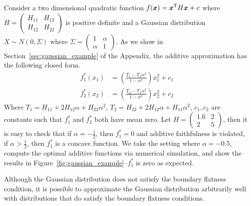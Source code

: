 \begin{example}
\label{examp:gaussian_counterexample}
Consider a two dimensional quadratic function $f( \mbox{\boldmath $x$}) = \mbox{\boldmath $x$}^{\mathsf{T}} H \mbox{\boldmath $x$} + c$ where $H = \begin{pmatrix} H_{11} & H_{12} \\ H_{12} & H_{22}\end{pmatrix}$ is positive definite and a Gaussian distribution $X \sim N(0, \Sigma)$ where $\Sigma = \begin{pmatrix}1 & \alpha \\ \alpha & 1 \end{pmatrix}$.
As we show in Section~\ref{sec:gaussian_example} of the Appendix, the additive approximation has the
following closed form.
\begin{align*}
f^*_1(x_1) &= \left( \frac{T_1 - T_2 \alpha^2}{1 - \alpha^4} \right) x_1^2 + c_1\\
f^*_2(x_2) &= \left( \frac{T_2 - T_1 \alpha^2}{1 - \alpha^4} \right) x_2^2 + c_2
\end{align*}
Where $T_1 = H_{11} + 2H_{12} \alpha + H_{22} \alpha^2$, $T_2 = H_{22} + 2H_{12} \alpha + H_{11} \alpha^2$, $c_1, c_2$ are constants such that $f^*_1$ and $f^*_2$ both have mean zero. Let $H = \begin{pmatrix} 1.6 & 2 \\ 2 & 5\end{pmatrix}$, then it is easy to check that if $\alpha = - \frac{1}{2}$, then $f^*_1 = 0$
and additive faithfulness is violated, if $\alpha > \frac{1}{2}$, then $f^*_1$ is a concave function. We take the setting where $\alpha=-0.5$, compute the optimal additive functions via numerical simulation, and show the results in Figure~\ref{fig:gaussian_example}--$f^*_1$ is zero as expected.
\end{example}

Although the Gaussian distribution does not satisfy the boundary flatness condition, it is possible to approximate the Gaussian distribution arbitrarily well with distributions that do satisfy the boundary flatness conditions.

